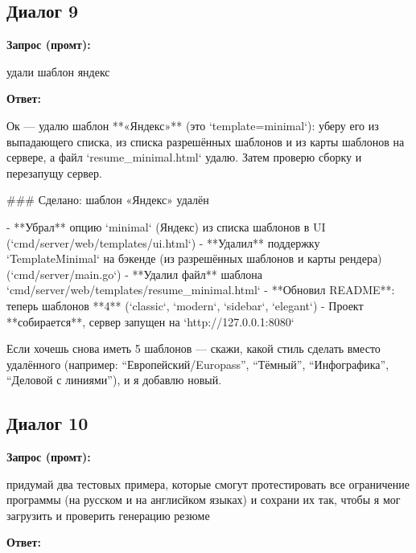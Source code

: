 \documentclass[a4paper, 14pt]{extarticle} %
\begin{document}
\subsection*{Диалог 9}

\textbf{Запрос (промт):}

\begin{PromptBlock}

удали шаблон яндекс

\end{PromptBlock}

\textbf{Ответ:}

\begin{AnswerBlock}

Ок — удалю шаблон **«Яндекс»** (это `template=minimal`): уберу его из выпадающего списка, из списка разрешённых шаблонов и из карты шаблонов на сервере, а файл `resume_minimal.html` удалю. Затем проверю сборку и перезапущу сервер.

### Сделано: шаблон «Яндекс» удалён

- **Убрал** опцию `minimal` (Яндекс) из списка шаблонов в UI (`cmd/server/web/templates/ui.html`)
- **Удалил** поддержку `TemplateMinimal` на бэкенде (из разрешённых шаблонов и карты рендера) (`cmd/server/main.go`)
- **Удалил файл** шаблона `cmd/server/web/templates/resume_minimal.html`
- **Обновил README**: теперь шаблонов **4** (`classic`, `modern`, `sidebar`, `elegant`)
- Проект **собирается**, сервер запущен на `http://127.0.0.1:8080`

Если хочешь снова иметь 5 шаблонов — скажи, какой стиль сделать вместо удалённого (например: “Европейский/Europass”, “Тёмный”, “Инфографика”, “Деловой с линиями”), и я добавлю новый.

\end{AnswerBlock}

\subsection*{Диалог 10}

\textbf{Запрос (промт):}

\begin{PromptBlock}

придумай два тестовых примера, которые смогут протестировать все ограничение программы (на русском и на англисйком языках) и сохрани их так, чтобы я мог загрузить и проверить генерацию резюме

\end{PromptBlock}

\textbf{Ответ:}
\end{document}
